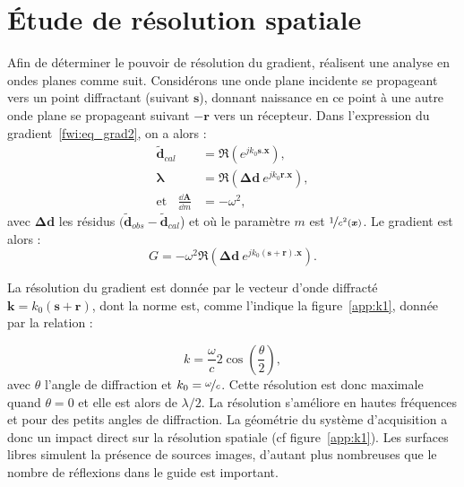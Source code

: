 

\section{Étude de résolution spatiale \label{app:section_reso}}

Afin de déterminer le pouvoir de résolution du gradient, \cite{sirgue} réalisent une analyse en ondes planes comme suit. Considérons une onde plane incidente se propageant vers un point diffractant (suivant $\bm{s}$), donnant naissance en ce point à une autre onde plane se propageant suivant $-\bm{r}$ vers un récepteur. Dans l'expression du gradient~\ref{fwi:eq_grad2}, on a alors : 
\begin{align}
	\bm{\tilde{d}}_{cal} &= \Re{(e^{jk_{0}\bm{s}.\bm{x}})},\\
	\bm{\lambda} &= \Re{(\bm{\Delta d}~e^{jk_{0}\bm{r}.\bm{x}})},\\
	\text{et}~~~~\frac{\dd \bm{A}}{\dd m} &= -\omega^2,
\end{align}
avec $ \bm{\Delta d}$ les résidus $(\bm{\tilde{d}}_{obs}-\bm{\tilde{d}}_{cal}$) et où le paramètre $m$ est $\nicefrac{1}{c^2(\bm{x})}$. Le gradient est alors : 
\begin{equation}
	G=-\omega^2 \Re(\bm{\Delta d}~e^{jk_{0}(\bm{s}+\bm{r}).\bm{x}}).
\end{equation} 


La résolution du gradient est donnée par le vecteur d'onde diffracté $\bm{k}=k_{0}(\bm{s}+\bm{r})$, dont la norme est, comme l'indique la figure~\ref{app:k1}, donnée par la relation :

\begin{equation}
	k= \frac{\omega}{c} 2 \cos\left( \frac{\theta}{2}\right),
	\label{app:nb_onde}
\end{equation}
avec $\theta$ l'angle de diffraction et $k_{0}=\nicefrac{\omega}{c}$.
Cette résolution est donc maximale quand $\theta=0$ et elle est alors de $\lambda/2$. La résolution s'améliore en hautes fréquences et pour des petits angles de diffraction. La géométrie du système d'acquisition a donc un impact direct sur la résolution spatiale (cf figure~\ref{app:k1}). Les surfaces libres simulent la présence de sources images, d'autant plus nombreuses que le nombre de réflexions dans le guide est important. \\

